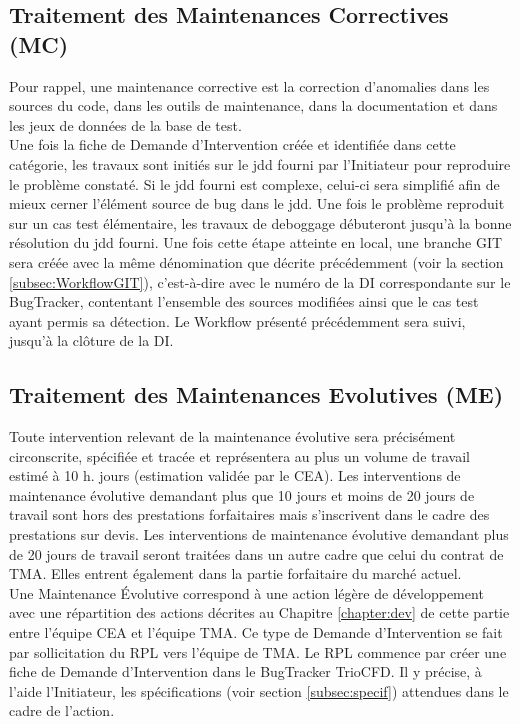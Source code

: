 \subsection{Traitement des Maintenances Correctives (MC)}
Pour rappel, une maintenance corrective est la correction d'anomalies dans les sources du code, dans les outils de maintenance, dans la documentation et dans les jeux de données de la base de test.\\
Une fois la fiche de Demande d'Intervention créée et identifiée dans cette catégorie, les travaux sont initiés sur le jdd fourni par l'Initiateur pour reproduire le problème constaté. Si le jdd fourni est complexe, celui-ci sera simplifié afin de mieux cerner l'élément source de bug dans le jdd. Une fois le problème reproduit sur un cas test élémentaire, les travaux de deboggage débuteront jusqu'à la bonne résolution du jdd fourni. Une fois cette étape atteinte en local, une branche GIT sera créée avec la même dénomination que décrite précédemment (voir la section \ref{subsec:WorkflowGIT}), c'est-à-dire avec le numéro de la DI correspondante sur le BugTracker, contentant l'ensemble des sources modifiées ainsi que le cas test ayant permis sa détection. Le Workflow présenté précédemment sera suivi, jusqu'à la clôture de la DI.\\

\subsection{Traitement des Maintenances Evolutives (ME)}
Toute intervention relevant de la maintenance évolutive sera précisément circonscrite, spécifiée et tracée et représentera au plus un volume de travail estimé à 10 h. jours (estimation validée par le CEA). Les interventions de maintenance évolutive demandant plus que 10 jours et moins de 20 jours de travail sont hors des prestations forfaitaires mais s'inscrivent dans le cadre des prestations sur devis. Les interventions de maintenance évolutive demandant plus de 20 jours de travail seront traitées dans un autre cadre que celui du contrat de TMA. Elles entrent également dans la partie forfaitaire du marché actuel.\\

Une Maintenance Évolutive correspond à une action légère de développement avec une répartition des actions décrites au Chapitre \ref{chapter:dev} de cette partie entre l'équipe CEA et l'équipe TMA. Ce type de Demande d'Intervention se fait par sollicitation du RPL vers l'équipe de TMA. Le RPL commence par créer une fiche de Demande d'Intervention dans le BugTracker TrioCFD. Il y précise, à l'aide l'Initiateur, les spécifications (voir section \ref{subsec:specif}) attendues dans le cadre de l'action.\\

